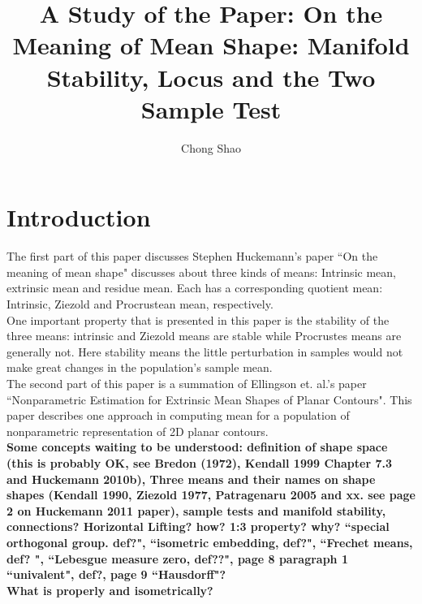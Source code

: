 \documentclass[12pt]{article}
\theoremstyle{definition}
\theoremstyle{remark}
\numberwithin{equation}{section}
\begin{document}
\title{
A Study of the Paper: On the Meaning of Mean Shape: Manifold Stability, Locus and the Two Sample Test}%
\author{Chong Shao}%

\maketitle
\section{Introduction}
The first part of this paper discusses Stephen Huckemann's paper ``On the meaning of mean shape" discusses about three kinds of means: Intrinsic mean, extrinsic mean and residue mean. Each has a corresponding quotient mean: Intrinsic, Ziezold and Procrustean mean, respectively. \\[0.2cm]
One important property that is presented in this paper is the stability of the three means: intrinsic and Ziezold means are stable while Procrustes means are generally not. Here stability means the little perturbation in samples would not make great changes in the population's sample mean. \\[0.2cm]
The second part of this paper is a summation of Ellingson et. al.'s paper ``Nonparametric Estimation for Extrinsic Mean Shapes of Planar Contours". This paper describes one approach in computing mean for a population of nonparametric representation of 2D planar contours.\\[0.2cm]
\textbf{Some concepts waiting to be understood: definition of shape space (this is probably OK, see Bredon (1972), Kendall 1999 Chapter 7.3 and Huckemann 2010b), Three means and their names on shape shapes (Kendall 1990, Ziezold 1977, Patragenaru 2005 and xx. see page 2 on Huckemann 2011 paper), sample tests and manifold stability, connections? Horizontal Lifting? how? 1:3 property? why? ``special orthogonal group. def?", ``isometric embedding, def?", ``Frechet means, def? ", ``Lebesgue measure zero, def??", page 8 paragraph 1 ``univalent", def?, page 9 ``Hausdorff"? \\ What is properly and isometrically?}
\end{document}
